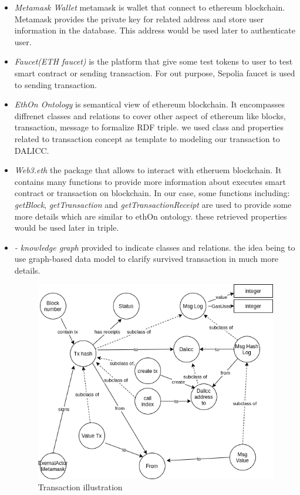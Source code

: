 \begin{itemize}
\item \textit{Metamask Wallet} metamask is wallet that connect to ethereum blockchain. Metamask provides the private key for related address and store user information in the database. This address would be used later to authenticate user.
\item \textit{Faucet(ETH faucet)} is the platform that give some test tokens to user to test smart contract or sending transaction. For out purpose, Sepolia faucet is used to sending transaction. 
\item \textit{EthOn Ontology} is semantical view of ethereum blockchain. It encompasses diffrenet classes and relations to cover other aspect of ethereum like blocks, transaction, message to formalize RDF triple.  
we used class and properties related to transaction concept as template to modeling our transaction to DALICC. 
\item \textit{Web3.eth} the package that allows to interact with etheruem blockchain. It contains many functions to provide more information about executes smart contract or transaction on blockchain. 
In our case, some functions including: \textit{getBlock}, \textit{getTransaction} and \textit{getTransactionReceipt} are used to provide some more details which are similar to ethOn ontology. 
these retrieved properties would be used later in triple.
\item \textit{- knowledge graph} provided to indicate classes and relations.
the idea being to use graph-based data model to clarify survived transaction in much more details. 
\begin{center}
	
	\begin{figure}[htb!]
		
		\begin{minipage}{0.75\linewidth}
			
			\includegraphics[width=1.45\textwidth]{images/chap03_knowledge_graph.png}
		\end{minipage}
		\caption{Transaction illustration}
		

\end{figure}
\end{center}
\end{itemize}
